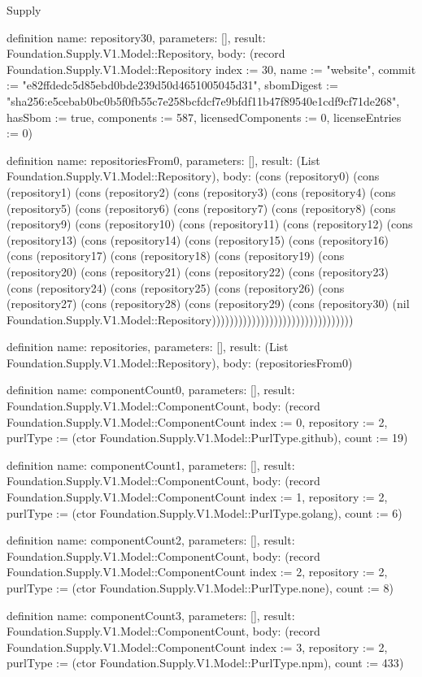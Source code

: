 \begin{lexlean}{Supply}
\begin{semanticmodule}
definition{
  name: repository30,
  parameters: [],
  result: Foundation.Supply.V1.Model::Repository,
  body: (record Foundation.Supply.V1.Model::Repository {index := 30, name := "website", commit := "e82ffdedc5d85ebd0bde239d50d4651005045d31", sbomDigest := "sha256:e5cebab0bc0b5f0fb55c7e258bcfdcf7e9bfdf11b47f89540e1cdf9cf71de268", hasSbom := true, components := 587, licensedComponents := 0, licenseEntries := 0})
}

definition{
  name: repositoriesFrom0,
  parameters: [],
  result: (List Foundation.Supply.V1.Model::Repository),
  body: (cons (repository0) (cons (repository1) (cons (repository2) (cons (repository3) (cons (repository4) (cons (repository5) (cons (repository6) (cons (repository7) (cons (repository8) (cons (repository9) (cons (repository10) (cons (repository11) (cons (repository12) (cons (repository13) (cons (repository14) (cons (repository15) (cons (repository16) (cons (repository17) (cons (repository18) (cons (repository19) (cons (repository20) (cons (repository21) (cons (repository22) (cons (repository23) (cons (repository24) (cons (repository25) (cons (repository26) (cons (repository27) (cons (repository28) (cons (repository29) (cons (repository30) (nil Foundation.Supply.V1.Model::Repository))))))))))))))))))))))))))))))))
}

definition{
  name: repositories,
  parameters: [],
  result: (List Foundation.Supply.V1.Model::Repository),
  body: (repositoriesFrom0)
}

definition{
  name: componentCount0,
  parameters: [],
  result: Foundation.Supply.V1.Model::ComponentCount,
  body: (record Foundation.Supply.V1.Model::ComponentCount {index := 0, repository := 2, purlType := (ctor Foundation.Supply.V1.Model::PurlType.github), count := 19})
}

definition{
  name: componentCount1,
  parameters: [],
  result: Foundation.Supply.V1.Model::ComponentCount,
  body: (record Foundation.Supply.V1.Model::ComponentCount {index := 1, repository := 2, purlType := (ctor Foundation.Supply.V1.Model::PurlType.golang), count := 6})
}

definition{
  name: componentCount2,
  parameters: [],
  result: Foundation.Supply.V1.Model::ComponentCount,
  body: (record Foundation.Supply.V1.Model::ComponentCount {index := 2, repository := 2, purlType := (ctor Foundation.Supply.V1.Model::PurlType.none), count := 8})
}

definition{
  name: componentCount3,
  parameters: [],
  result: Foundation.Supply.V1.Model::ComponentCount,
  body: (record Foundation.Supply.V1.Model::ComponentCount {index := 3, repository := 2, purlType := (ctor Foundation.Supply.V1.Model::PurlType.npm), count := 433})
}


\end{semanticmodule}
\end{lexlean}

